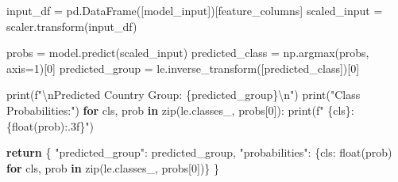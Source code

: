 \documentclass[
  letterpaper,
  DIV=11,
  numbers=noendperiod]{scrartcl}
\newenvironment{Shaded}{\begin{snugshade}}{\end{snugshade}}
\newcommand{\BuiltInTok}[1]{\textcolor[rgb]{0.00,0.23,0.31}{#1}}
\newcommand{\CharTok}[1]{\textcolor[rgb]{0.13,0.47,0.30}{#1}}
\newcommand{\ControlFlowTok}[1]{\textcolor[rgb]{0.00,0.23,0.31}{\textbf{#1}}}
\newcommand{\DecValTok}[1]{\textcolor[rgb]{0.68,0.00,0.00}{#1}}
\newcommand{\KeywordTok}[1]{\textcolor[rgb]{0.00,0.23,0.31}{\textbf{#1}}}
\newcommand{\NormalTok}[1]{\textcolor[rgb]{0.00,0.23,0.31}{#1}}
\newcommand{\OperatorTok}[1]{\textcolor[rgb]{0.37,0.37,0.37}{#1}}
\newcommand{\SpecialCharTok}[1]{\textcolor[rgb]{0.37,0.37,0.37}{#1}}
\newcommand{\SpecialStringTok}[1]{\textcolor[rgb]{0.13,0.47,0.30}{#1}}
\newcommand{\StringTok}[1]{\textcolor[rgb]{0.13,0.47,0.30}{#1}}
\begin{document}
\begin{Shaded}
\begin{Highlighting}[]
\NormalTok{    input\_df }\OperatorTok{=}\NormalTok{ pd.DataFrame([model\_input])[feature\_columns]}
\NormalTok{    scaled\_input }\OperatorTok{=}\NormalTok{ scaler.transform(input\_df)}


\NormalTok{    probs }\OperatorTok{=}\NormalTok{ model.predict(scaled\_input)}
\NormalTok{    predicted\_class }\OperatorTok{=}\NormalTok{ np.argmax(probs, axis}\OperatorTok{=}\DecValTok{1}\NormalTok{)[}\DecValTok{0}\NormalTok{]}
\NormalTok{    predicted\_group }\OperatorTok{=}\NormalTok{ le.inverse\_transform([predicted\_class])[}\DecValTok{0}\NormalTok{]}

    \BuiltInTok{print}\NormalTok{(}\SpecialStringTok{f"}\CharTok{\textbackslash{}n}\SpecialStringTok{Predicted Country Group: }\SpecialCharTok{\{}\NormalTok{predicted\_group}\SpecialCharTok{\}}\CharTok{\textbackslash{}n}\SpecialStringTok{"}\NormalTok{)}
    \BuiltInTok{print}\NormalTok{(}\StringTok{"Class Probabilities:"}\NormalTok{)}
    \ControlFlowTok{for}\NormalTok{ cls, prob }\KeywordTok{in} \BuiltInTok{zip}\NormalTok{(le.classes\_, probs[}\DecValTok{0}\NormalTok{]):}
        \BuiltInTok{print}\NormalTok{(}\SpecialStringTok{f"  }\SpecialCharTok{\{}\NormalTok{cls}\SpecialCharTok{\}}\SpecialStringTok{: }\SpecialCharTok{\{}\BuiltInTok{float}\NormalTok{(prob)}\SpecialCharTok{:.3f\}}\SpecialStringTok{"}\NormalTok{)}

    \ControlFlowTok{return}\NormalTok{ \{}
        \StringTok{"predicted\_group"}\NormalTok{: predicted\_group,}
        \StringTok{"probabilities"}\NormalTok{: \{cls: }\BuiltInTok{float}\NormalTok{(prob) }\ControlFlowTok{for}\NormalTok{ cls, prob }\KeywordTok{in} \BuiltInTok{zip}\NormalTok{(le.classes\_, probs[}\DecValTok{0}\NormalTok{])\}}
\NormalTok{    \}}
\end{Highlighting}
\end{Shaded}
\end{document}
